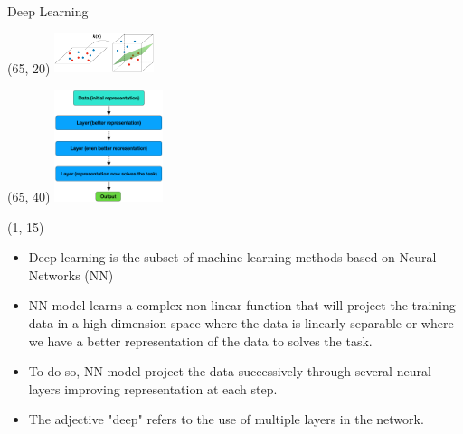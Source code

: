   \begin{frame}{Deep Learning}  

    \begin{textblock}{40}(65, 20)
        \includegraphics[width=110px]{img/projection.png}
    \end{textblock}
    \begin{textblock}{40}(65, 40)
    \includegraphics[width=120px]{img/projection_dl.png}
    \end{textblock}

    
    \begin{textblock}{60}(1, 15)
        \begin{itemize}
            \item Deep learning is the subset of machine learning methods based on Neural Networks (NN)
            \item NN model learns a complex non-linear function that will project the training data in a high-dimension space where the data is linearly separable or where we have a better representation of the data to solves the task. 
            \item To do so, NN model project the data successively through several neural layers improving representation at each step. 
            \item The adjective "deep" refers to the use of multiple layers in the network.
          \end{itemize}
    \end{textblock}
  
  
  \end{frame}

